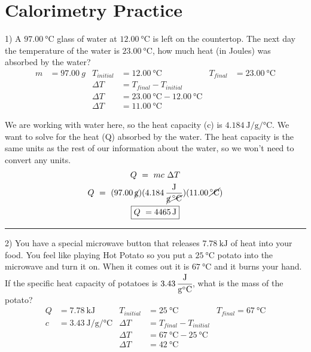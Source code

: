 \documentclass[12pt, oneside, letterpaper]{book}
\begin{document}
%
\pagestyle{fancy} %
\renewcommand{\headrulewidth}{0pt}
\fancyhead{}
\fancyhead[R]{\thepage}
\fancyfoot{} %
\renewcommand{\footrulewidth}{0.1pt}
%
%
%
\section{Calorimetry Practice} 

1) A $\qty{97.00}{\degreeCelsius}$ glass of water at $\qty{12.00}{\degreeCelsius}$ is left on the countertop. The next day the temperature of the water is $\qty{23.00}{\degreeCelsius}$, how much heat (in Joules) was absorbed by the water?
\begin{align*}
m &= 97.00\ g  
    &   T_{initial}&=\qty{12.00}{\degreeCelsius} 
    &  T_{final} &=\qty{23.00}{\degreeCelsius} 
\\ 
&& \Delta T&=T_{final}-T_{initial}
\\
&&  \Delta T&=\qty{23.00}{\degreeCelsius} - \qty{12.00}{\degreeCelsius}  
\\ 
&& \Delta T &= \qty{11.00}{\degreeCelsius}
\end{align*}

We are working with water here, so the heat capacity (c) is $\qty[per-mode=fraction]{4.184}{\joule\per\gram\per\degreeCelsius}$. We want to solve for the heat (Q) absorbed by the water. The heat capacity is the same units as the rest of our information about the water, so we won't need to convert any units. 
\begin{gather*} 
Q\ =\  mc\ \Delta T 
\\ 
Q\ =\ (\qty{97.00}{\cancel\gram}) (\qty[per-mode=fraction]{4.184}{\joule\per\cancel\gram\per\cancel\degreeCelsius})(\qty{11.00}{\cancel\degreeCelsius}) 
\\ 
\boxed{Q\ = \qty{4465}{\joule}}
\end{gather*}
\hrule

2) You have a special microwave button that releases $\qty{7.78}{\kilo\joule}$ of heat into your food. You feel like playing Hot Potato so you put a $\qty{25}{\degreeCelsius}$ potato into the microwave and turn it on. When it comes out it is $\qty{67}{\degreeCelsius}$ and it burns your hand. If the specific heat capacity of potatoes is $\qty{3.43}{  \cfrac{\joule}{\gram\degreeCelsius}}$, what is the mass of the potato?
\begin{align*}
Q &= \qty{7.78}{\kilo\joule}  
    &T_{initial}&=\qty{25}{\degreeCelsius} 
    &  T_{final} =\qty{67}{\degreeCelsius}
\\ 
c&=\qty[per-mode=fraction]{3.43}{\joule\per\gram\per\degreeCelsius} 
    & \Delta T&=T_{final}-T_{initial}
\\
&&  \Delta T&=\qty{67}{\degreeCelsius} - \qty{25}{\degreeCelsius} 
\\ 
&& \Delta T &= \qty{42}{\degreeCelsius}
\end{align*}
\end{document}
